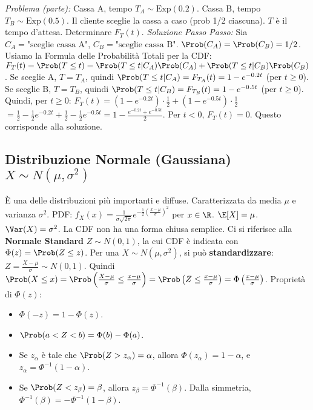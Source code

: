 \begin{example}
\textit{Problema (parte):} Cassa A, tempo $T_A \sim \text{Exp}(0.2)$. Cassa B, tempo $T_B \sim \text{Exp}(0.5)$. Il cliente sceglie la cassa a caso (prob 1/2 ciascuna). $T$ è il tempo d'attesa.
Determinare $F_T(t)$.
\textit{Soluzione Passo Passo:}
Sia $C_A = \text{"sceglie cassa A"}$, $C_B = \text{"sceglie cassa B"}$. $\Prob(C_A)=\Prob(C_B)=1/2$.
Usiamo la Formula delle Probabilità Totali per la CDF:
$F_T(t) = \Prob(T \le t) = \Prob(T \le t | C_A)\Prob(C_A) + \Prob(T \le t | C_B)\Prob(C_B)$.
Se sceglie A, $T=T_A$, quindi $\Prob(T \le t | C_A) = F_{T_A}(t) = 1 - e^{-0.2t}$ (per $t \ge 0$).
Se sceglie B, $T=T_B$, quindi $\Prob(T \le t | C_B) = F_{T_B}(t) = 1 - e^{-0.5t}$ (per $t \ge 0$).
Quindi, per $t \ge 0$:
$F_T(t) = (1 - e^{-0.2t}) \cdot \frac{1}{2} + (1 - e^{-0.5t}) \cdot \frac{1}{2}$
$= \frac{1}{2} - \frac{1}{2}e^{-0.2t} + \frac{1}{2} - \frac{1}{2}e^{-0.5t} = 1 - \frac{e^{-0.2t} + e^{-0.5t}}{2}$.
Per $t < 0$, $F_T(t)=0$.
Questo corrisponde alla soluzione.
\end{example}

\subsection{Distribuzione Normale (Gaussiana) \texorpdfstring{$X \sim N(\mu, \sigma^2)$}{X ~ N(mu, sigma^2)}}
È una delle distribuzioni più importanti e diffuse. Caratterizzata da media $\mu$ e varianza $\sigma^2$.
PDF: $f_X(x) = \frac{1}{\sigma\sqrt{2\pi}} e^{-\frac{1}{2}\left(\frac{x-\mu}{\sigma}\right)^2}$ per $x \in \R$.
$\E[X] = \mu$.
$\Var(X) = \sigma^2$.
La CDF non ha una forma chiusa semplice. Ci si riferisce alla \textbf{Normale Standard} $Z \sim N(0,1)$, la cui CDF è indicata con $\Phi(z) = \Prob(Z \le z)$.
Per una $X \sim N(\mu, \sigma^2)$, si può \textbf{standardizzare}: $Z = \frac{X-\mu}{\sigma} \sim N(0,1)$.
Quindi $\Prob(X \le x) = \Prob\left(\frac{X-\mu}{\sigma} \le \frac{x-\mu}{\sigma}\right) = \Prob\left(Z \le \frac{x-\mu}{\sigma}\right) = \Phi\left(\frac{x-\mu}{\sigma}\right)$.
Proprietà di $\Phi(z)$:
\begin{itemize}
    \item $\Phi(-z) = 1 - \Phi(z)$.
    \item $\Prob(a < Z < b) = \Phi(b) - \Phi(a)$.
    \item Se $z_\alpha$ è tale che $\Prob(Z > z_\alpha) = \alpha$, allora $\Phi(z_\alpha)=1-\alpha$, e $z_\alpha = \Phi^{-1}(1-\alpha)$.
    \item Se $\Prob(Z < z_\beta) = \beta$, allora $z_\beta = \Phi^{-1}(\beta)$. Dalla simmetria, $\Phi^{-1}(\beta) = -\Phi^{-1}(1-\beta)$.
\end{itemize}

